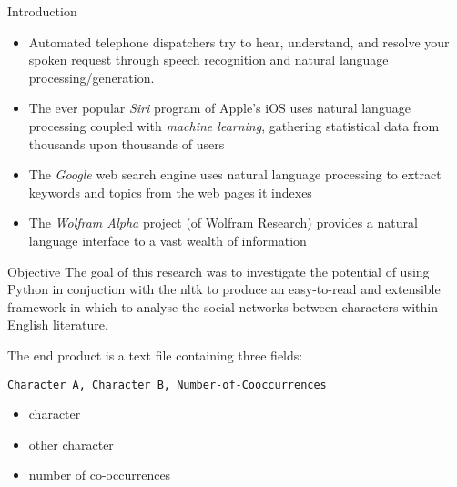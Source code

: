 \documentclass{beamer}
\begin{document}
\begin{frame}[t,fragile]{}
\begin{columns}
\begin{column}{.45\textwidth}
\begin{block}{Introduction}
        \begin{itemize}
        \item Automated telephone dispatchers try to hear, understand,
          and resolve your spoken request through speech recognition
          and natural language processing/generation.
        \item The ever popular \textit{Siri} program of Apple's iOS
          uses natural language processing coupled with
          \textit{machine learning}, gathering statistical data from
          thousands upon thousands of users \parencite{lohr12:big-data-age}
        \item The \textit{Google} web search engine uses natural
          language processing to extract keywords and topics from the
          web pages it indexes \parencite{ganchev12:search-logs-query-tagging}
        \item The \textit{Wolfram Alpha} project (of Wolfram Research)
          provides a natural language interface to a vast wealth of
          information \parencite{press:wolfram09:wa-launch}
        \end{itemize}
      \end{block}


      \begin{block}{Objective}
        The goal of this research was to investigate the potential of
        using Python in conjuction with the
        \ac{nltk} \parencite{bird09:nltk} to produce an easy-to-read
        and extensible framework in which to analyse the social
        networks between characters within English literature.

        The end product is a text file containing three fields:
        \vspace{1ex plus 0.1ex minus 0.1ex}
        
        \begin{lstlisting}[frame=shadowbox]
          Character A, Character B, Number-of-Cooccurrences
        \end{lstlisting}


        \begin{itemize}
        \item character
        \item other character
        \item number of co-occurrences
        \end{itemize}


\end{block}
\end{column}
\end{columns}
\end{frame}
\end{document}
